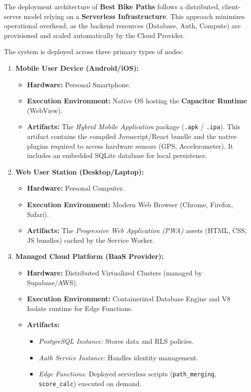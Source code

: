 The deployment architecture of \textbf{Best Bike Paths} follows a distributed, client-server model relying on a \textbf{Serverless Infrastructure}. This approach minimizes operational overhead, as the backend resources (Database, Auth, Compute) are provisioned and scaled automatically by the Cloud Provider.

The system is deployed across three primary types of nodes:

\begin{enumerate}
    \item \textbf{Mobile User Device (Android/iOS):}
    \begin{itemize}
        \item \textbf{Hardware:} Personal Smartphone.
        \item \textbf{Execution Environment:} Native OS hosting the \textbf{Capacitor Runtime} (WebView).
        \item \textbf{Artifacts:} The \textit{Hybrid Mobile Application} package (\texttt{.apk} / \texttt{.ipa}). This artifact contains the compiled Javascript/React bundle and the native plugins required to access hardware sensors (GPS, Accelerometer). It includes an embedded SQLite database for local persistence.
    \end{itemize}

    \item \textbf{Web User Station (Desktop/Laptop):}
    \begin{itemize}
        \item \textbf{Hardware:} Personal Computer.
        \item \textbf{Execution Environment:} Modern Web Browser (Chrome, Firefox, Safari).
        \item \textbf{Artifacts:} The \textit{Progressive Web Application (PWA)} assets (HTML, CSS, JS bundles) cached by the Service Worker.
    \end{itemize}

    \item \textbf{Managed Cloud Platform (BaaS Provider):}
    \begin{itemize}
        \item \textbf{Hardware:} Distributed Virtualized Clusters (managed by Supabase/AWS).
        \item \textbf{Execution Environment:} Containerized Database Engine and V8 Isolate runtime for Edge Functions.
        \item \textbf{Artifacts:}
        \begin{itemize}
            \item \textit{PostgreSQL Instance:} Stores data and RLS policies.
            \item \textit{Auth Service Instance:} Handles identity management.
            \item \textit{Edge Functions:} Deployed serverless scripts (\texttt{path\_merging}, \texttt{score\_calc}) executed on demand.
        \end{itemize}
    \end{itemize}
\end{enumerate}

